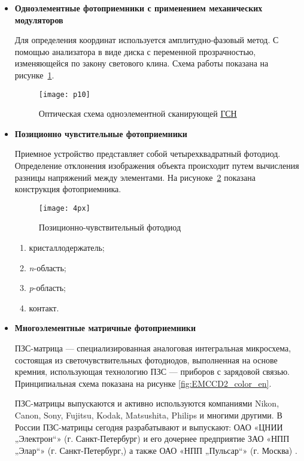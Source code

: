 \begin{itemize}
	\item \textbf{Одноэлементные фотоприемники с применением механических модуляторов}
	
	Для определения координат используется амплитудно-фазовый метод. С помощью анализатора в виде диска с переменной прозрачностью, изменяющейся по закону светового клина. \cite[]{bibook1} Схема работы показана на рисунке~\ref{fig:p10}.
	
	\begin{figure}[ht]
		\centering
		\texttt{[image: p10]} 
		\caption{Оптическая схема одноэлементной сканирующей \hyperref[acroGSN]{ГСН} }
		\label{fig:p10}
	\end{figure}

	\item \textbf{Позиционно чувстительные фотоприемники}
	
	Приемное устройство представляет собой четырехквадратный фотодиод. Определение отклонения изображения объекта происходит путем вычисления разницы напряжений между элементами. На рисуноке~\ref{fig:4px} показана конструкция фотоприемника.
\newpage	
	\begin{figure}[ht]
		\centering
		\texttt{[image: 4px]} 
		\caption{Позиционно-чувствительный фотодиод}
		\label{fig:4px}
	\end{figure}
	
	\begin{enumerate}
		\item кристаллодержатель;
		\item \textit{n}-область;
		\item \textit{p}-область;
		\item контакт.
	\end{enumerate}

	\item \textbf{Многоэлементные матричные фотоприемники}
	
	ПЗС-матрица — специализированная аналоговая интегральная микросхема, состоящая из светочувствительных фотодиодов, выполненная на основе кремния, использующая технологию ПЗС — приборов с зарядовой связью. Принципиальная схема показана на рисунке \ref{fig:EMCCD2_color_en}.
	
	ПЗС-матрицы выпускаются и активно используются компаниями Nikon, Canon, Sony, Fujitsu, Kodak, Matsushita, Philips и многими другими. В России ПЗС-матрицы сегодня разрабатывают и выпускают: ОАО «ЦНИИ „Электрон“» (г. Санкт-Петербург) и его дочернее предприятие ЗАО «НПП „Элар“» (г. Санкт-Петербург,) а также ОАО «НПП „Пульсар“» (г. Москва) \cite[]{CCD}.
	

\end{itemize}

